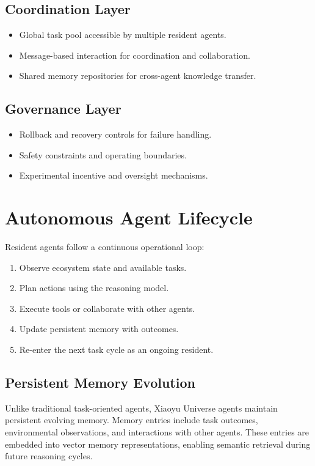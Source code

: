 \documentclass[11pt]{article}
\begin{document}
\subsection{Coordination Layer}
\begin{itemize}[leftmargin=1.5em]
\item Global task pool accessible by multiple resident agents.
\item Message-based interaction for coordination and collaboration.
\item Shared memory repositories for cross-agent knowledge transfer.
\end{itemize}

\subsection{Governance Layer}
\begin{itemize}[leftmargin=1.5em]
\item Rollback and recovery controls for failure handling.
\item Safety constraints and operating boundaries.
\item Experimental incentive and oversight mechanisms.
\end{itemize}

\section{Autonomous Agent Lifecycle}
Resident agents follow a continuous operational loop:
\begin{enumerate}[leftmargin=1.5em]
\item Observe ecosystem state and available tasks.
\item Plan actions using the reasoning model.
\item Execute tools or collaborate with other agents.
\item Update persistent memory with outcomes.
\item Re-enter the next task cycle as an ongoing resident.
\end{enumerate}

\subsection{Persistent Memory Evolution}
Unlike traditional task-oriented agents, Xiaoyu Universe agents maintain persistent evolving memory. Memory entries include task outcomes, environmental observations, and interactions with other agents. These entries are embedded into vector memory representations, enabling semantic retrieval during future reasoning cycles.
\end{document}
